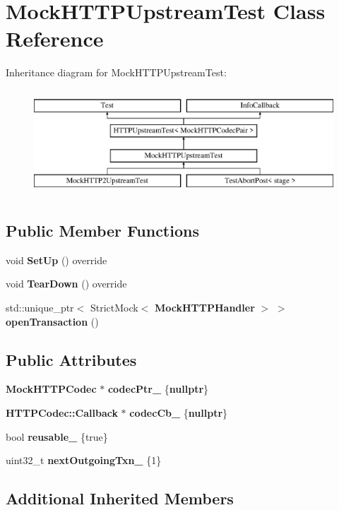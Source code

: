 \section{Mock\+H\+T\+T\+P\+Upstream\+Test Class Reference}
\label{classMockHTTPUpstreamTest}
Inheritance diagram for Mock\+H\+T\+T\+P\+Upstream\+Test\+:\begin{figure}[H]
\begin{center}
\leavevmode
\includegraphics[height=4.000000cm]{classMockHTTPUpstreamTest}
\end{center}
\end{figure}
\subsection*{Public Member Functions}
\begin{DoxyCompactItemize}
\item 
void {\bf Set\+Up} () override
\item 
void {\bf Tear\+Down} () override
\item 
std\+::unique\+\_\+ptr$<$ Strict\+Mock$<$ {\bf Mock\+H\+T\+T\+P\+Handler} $>$ $>$ {\bf open\+Transaction} ()
\end{DoxyCompactItemize}
\subsection*{Public Attributes}
\begin{DoxyCompactItemize}
\item 
{\bf Mock\+H\+T\+T\+P\+Codec} $\ast$ {\bf codec\+Ptr\+\_\+} \{{\bf nullptr}\}
\item 
{\bf H\+T\+T\+P\+Codec\+::\+Callback} $\ast$ {\bf codec\+Cb\+\_\+} \{{\bf nullptr}\}
\item 
bool {\bf reusable\+\_\+} \{true\}
\item 
uint32\+\_\+t {\bf next\+Outgoing\+Txn\+\_\+} \{1\}
\end{DoxyCompactItemize}
\subsection*{Additional Inherited Members}


